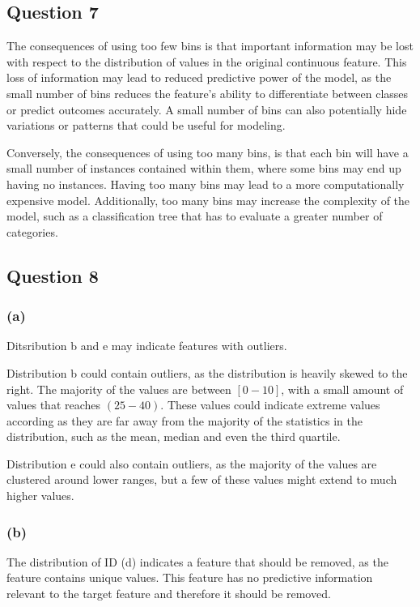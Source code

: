 \documentclass[10pt]{article}
\begin{document}
\subsection*{Question 7}

The consequences of using too few bins is that important information may be lost with respect to the
distribution of values in the original continuous feature. This loss of information may lead to reduced
predictive power of the model, as the small number of bins
reduces the feature's ability to differentiate between classes or predict outcomes accurately. A small number of
bins can also potentially hide variations or patterns that could be useful for modeling.

Conversely, the consequences of using too many bins, is that each bin will have a small number of instances
contained within them, where some bins may end up having no instances. Having too many bins may lead to
a more computationally expensive model. Additionally, too many bins may increase the complexity of the model,
such as a classification tree that has to evaluate a greater number of categories.

\subsection*{Question 8}

\subsubsection*{(a)}

Ditsribution b and e may indicate features with outliers.

Distribution b could contain outliers, as the distribution is heavily skewed to the right. The majority of the
values are between $[0-10]$, with a small amount of values that reaches $(25-40)$. These values could indicate
extreme values according as they are far away from the majority of the statistics in the distribution, such
as the mean, median and even the third quartile.

Distribution e could also contain outliers, as the majority of the values are clustered around lower ranges, but a few
of these values might extend to much higher values.

\subsubsection*{(b)}

The distribution of ID (d) indicates a feature that should be removed, as the feature contains unique values.
This feature has no predictive information relevant to the target feature and therefore it should be removed.
\end{document}

